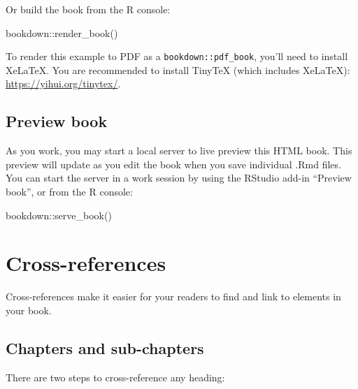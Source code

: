 \documentclass[12pt, oneside, openright]{byuthesis}
\newenvironment{Shaded}{\begin{snugshade}}{\end{snugshade}}
\newcommand{\FunctionTok}[1]{\textcolor[rgb]{0.00,0.00,0.00}{#1}}
\newcommand{\NormalTok}[1]{#1}
\newcommand{\SpecialCharTok}[1]{\textcolor[rgb]{0.00,0.00,0.00}{#1}}
\begin{document}
Or build the book from the R console:

\begin{Shaded}
\begin{Highlighting}[]
\NormalTok{bookdown}\SpecialCharTok{::}\FunctionTok{render\_book}\NormalTok{()}
\end{Highlighting}
\end{Shaded}

To render this example to PDF as a \texttt{bookdown::pdf\_book}, you'll need to install XeLaTeX. You are recommended to install TinyTeX (which includes XeLaTeX): \url{https://yihui.org/tinytex/}.

\hypertarget{preview-book}{%
\section{Preview book}\label{preview-book}}

As you work, you may start a local server to live preview this HTML book. This preview will update as you edit the book when you save individual .Rmd files. You can start the server in a work session by using the RStudio add-in ``Preview book'', or from the R console:

\begin{Shaded}
\begin{Highlighting}[]
\NormalTok{bookdown}\SpecialCharTok{::}\FunctionTok{serve\_book}\NormalTok{()}
\end{Highlighting}
\end{Shaded}

\hypertarget{cross}{%
\chapter{Cross-references}\label{cross}}

Cross-references make it easier for your readers to find and link to elements in your book.

\hypertarget{chapters-and-sub-chapters}{%
\section{Chapters and sub-chapters}\label{chapters-and-sub-chapters}}

There are two steps to cross-reference any heading:
\end{document}
